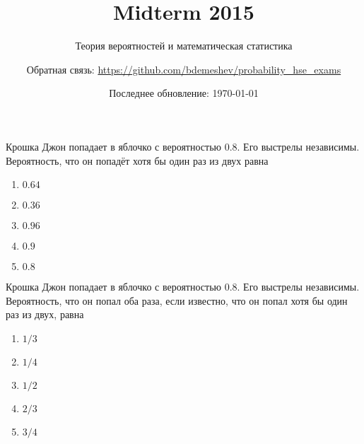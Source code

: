 \documentclass[t]{beamer}
\title{Midterm 2015}
\subtitle{Теория вероятностей и математическая статистика}
\author{Обратная связь: \url{https://github.com/bdemeshev/probability_hse_exams}}
\date{Последнее обновление: \today}
\begin{document}
 

\frame[plain]{\titlepage}

 \begin{frame} \label{1} 
\begin{block}{1} 

Крошка Джон  попадает в яблочко с вероятностью $0.8$. Его выстрелы независимы. Вероятность, что он попадёт хотя бы один раз из двух равна
 


 \end{block} 
\begin{enumerate} 
\item[] \hyperlink{1-No}{\beamergotobutton{} $0.64$}
\item[] \hyperlink{1-No}{\beamergotobutton{} $0.36$}
\item[] \hyperlink{1-Yes}{\beamergotobutton{} $0.96$}
\item[] \hyperlink{1-No}{\beamergotobutton{} $0.9$
}
\item[] \hyperlink{1-No}{\beamergotobutton{} $0.8$}
\end{enumerate} 
\end{frame} 


 \begin{frame} \label{2} 
\begin{block}{2} 

Крошка Джон попадает в яблочко с вероятностью $0.8$. Его выстрелы независимы. Вероятность, что он попал оба раза, если известно, что он попал хотя бы один раз из двух, равна
    


 \end{block} 
\begin{enumerate} 
\item[] \hyperlink{2-No}{\beamergotobutton{} $1/3$}
\item[] \hyperlink{2-No}{\beamergotobutton{} $1/4$
}
\item[] \hyperlink{2-No}{\beamergotobutton{} $1/2$}
\item[] \hyperlink{2-Yes}{\beamergotobutton{} $2/3$}
\item[] \hyperlink{2-No}{\beamergotobutton{} $3/4$}
\end{enumerate} 
\end{frame} 
\end{document}
